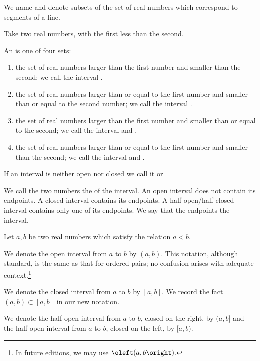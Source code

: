 

We name and denote subsets of the set of real numbers which correspond to segments of a line.


Take two real numbers, with the
first less than the second.

An
is one of four sets:
\begin{enumerate}
  \item
  the set of real numbers larger
  than the first number and smaller
  than the second; we call the
  interval .

  \item
  the set of real numbers larger than
  or equal to the first number and
  smaller than or equal to the second
  number; we call the interval
  .

  \item
  the set of real numbers larger
  than the first number and smaller
  than or equal to the second;
  we call the interval
  and
  .

  \item
  the set of real numbers larger
  than or equal to the first number
  and smaller than the second;
  we call the interval
  and
  .
\end{enumerate}
If an interval is neither open
nor closed we call it
or

We call the two numbers
the
of the interval.
An open interval does not
contain its endpoints.
A closed interval contains
its endpoints.
A half-open/half-closed
interval contains only one
of its endpoints.
We say that the
endpoints
the interval.


Let $a, b$ be two real numbers
which satisfy the relation $a < b$.

We denote the open interval from
$a$ to $b$ by $(a, b)$.
This notation, although standard,
is the same as that for ordered pairs;
no confusion arises with adequate context.\footnote{In future editions, we may use $\oleft(a, b\oright)$.}

We denote the closed interval from
$a$ to $b$ by $[a, b]$.
We record the fact
$(a, b) \subset [a, b]$
in our new notation.

We denote the half-open interval
from $a$ to $b$,
closed on the right, by $(a, b]$
and the half-open interval
from $a$ to $b$,
closed on the left, by $[a, b)$.
